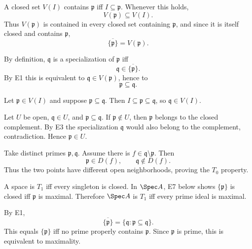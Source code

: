 \begin{solution}[E1]
A closed set $V(I)$ contains $\mathfrak p$ iff $I\subseteq\mathfrak p$.  Whenever this
holds,
\[
V(\mathfrak p)\subseteq V(I).
\]
Thus $V(\mathfrak p)$ is contained in every closed set containing $\mathfrak p$, and since
it is itself closed and contains $\mathfrak p$,
\[
\overline{\{\mathfrak p\}}=V(\mathfrak p).
\]
\end{solution}

\begin{solution}[E2]
By definition, $\mathfrak q$ is a specialization of $\mathfrak p$ iff
\[
\mathfrak q\in\overline{\{\mathfrak p\}}.
\]
By E1 this is equivalent to $\mathfrak q\in V(\mathfrak p)$, hence to
\[
\mathfrak p\subseteq\mathfrak q.
\]
\end{solution}

\begin{solution}[E3]
Let $\mathfrak p\in V(I)$ and suppose $\mathfrak p\subseteq\mathfrak q$.  Then
$I\subseteq\mathfrak p\subseteq\mathfrak q$, so $\mathfrak q\in V(I)$.
\end{solution}

\begin{solution}[E4]
Let $U$ be open, $\mathfrak q\in U$, and $\mathfrak p\subseteq\mathfrak q$.  If
$\mathfrak p\notin U$, then $\mathfrak p$ belongs to the closed complement.  By E3 the
specialization $\mathfrak q$ would also belong to the complement, contradiction.  Hence
$\mathfrak p\in U$.
\end{solution}

\begin{solution}[E5]
Take distinct primes $\mathfrak p,\mathfrak q$.  Assume there is
$f\in\mathfrak q\setminus\mathfrak p$.  Then
\[
\mathfrak p\in D(f),\qquad \mathfrak q\notin D(f).
\]
Thus the two points have different open neighborhoods, proving the $T_0$ property.
\end{solution}

\begin{solution}[E6]
A space is $T_1$ iff every singleton is closed.  In $\Spec A$, E7 below shows
$\{\mathfrak p\}$ is closed iff $\mathfrak p$ is maximal.  Therefore $\Spec A$ is $T_1$
iff every prime ideal is maximal.
\end{solution}

\begin{solution}[E7]
By E1,
\[
\overline{\{\mathfrak p\}}
=
\{\mathfrak q:\mathfrak p\subseteq\mathfrak q\}.
\]
This equals $\{\mathfrak p\}$ iff no prime properly contains $\mathfrak p$.  Since
$\mathfrak p$ is prime, this is equivalent to maximality.
\end{solution}

